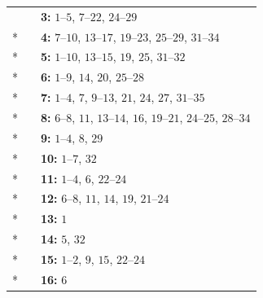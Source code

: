 \begin{longtable}{p{3.5cm}p{2.2cm}p{8.3cm}}
 &  & \textbf{3:} \mbox{$1$--$5$}, \mbox{$7$--$22$}, \mbox{$24$--$29$} \\*
 &  & \textbf{4:} \mbox{$7$--$10$}, \mbox{$13$--$17$}, \mbox{$19$--$23$}, \mbox{$25$--$29$}, \mbox{$31$--$34$} \\*
 &  & \textbf{5:} \mbox{$1$--$10$}, \mbox{$13$--$15$}, \mbox{$19$}, \mbox{$25$}, \mbox{$31$--$32$} \\*
 &  & \textbf{6:} \mbox{$1$--$9$}, \mbox{$14$}, \mbox{$20$}, \mbox{$25$--$28$} \\*
 &  & \textbf{7:} \mbox{$1$--$4$}, \mbox{$7$}, \mbox{$9$--$13$}, \mbox{$21$}, \mbox{$24$}, \mbox{$27$}, \mbox{$31$--$35$} \\*
 &  & \textbf{8:} \mbox{$6$--$8$}, \mbox{$11$}, \mbox{$13$--$14$}, \mbox{$16$}, \mbox{$19$--$21$}, \mbox{$24$--$25$}, \mbox{$28$--$34$} \\*
 &  & \textbf{9:} \mbox{$1$--$4$}, \mbox{$8$}, \mbox{$29$} \\*
 &  & \textbf{10:} \mbox{$1$--$7$}, \mbox{$32$} \\*
 &  & \textbf{11:} \mbox{$1$--$4$}, \mbox{$6$}, \mbox{$22$--$24$} \\*
 &  & \textbf{12:} \mbox{$6$--$8$}, \mbox{$11$}, \mbox{$14$}, \mbox{$19$}, \mbox{$21$--$24$} \\*
 &  & \textbf{13:} \mbox{$1$} \\*
 &  & \textbf{14:} \mbox{$5$}, \mbox{$32$} \\*
 &  & \textbf{15:} \mbox{$1$--$2$}, \mbox{$9$}, \mbox{$15$}, \mbox{$22$--$24$} \\*
 &  & \textbf{16:} \mbox{$6$} \\
\end{longtable}
